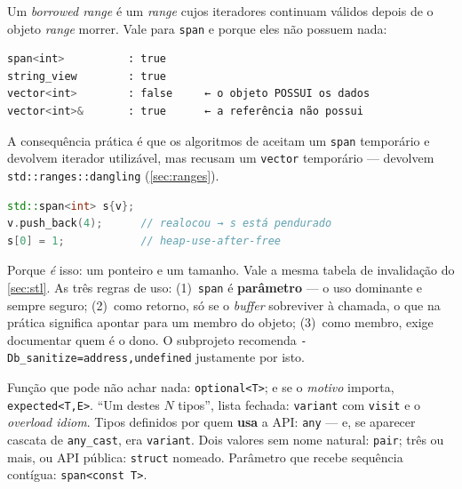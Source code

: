 Um \emph{borrowed range} é um \emph{range} cujos iteradores continuam válidos
depois de o objeto \emph{range} morrer. Vale para \texttt{span} e
 porque eles não possuem nada:

\begin{lstlisting}[style=bt, language=bash,
    caption={Saída de \texttt{src/vocabulary\_types/}:
             \texttt{std::ranges::borrowed\_range}.}]
span<int>          : true
string_view        : true
vector<int>        : false     ← o objeto POSSUI os dados
vector<int>&       : true      ← a referência não possui
\end{lstlisting}

A consequência prática é que os algoritmos de  aceitam um
\texttt{span} temporário e devolvem iterador utilizável, mas recusam um
\texttt{vector} temporário --- devolvem \texttt{std::ranges::dangling}
(\cref{sec:ranges}).

\begin{armadilha}
\begin{lstlisting}[style=bt, language=C++, frame=none,
                   xleftmargin=0pt, xrightmargin=0pt]
std::span<int> s{v};
v.push_back(4);      // realocou → s está pendurado
s[0] = 1;            // heap-use-after-free
\end{lstlisting}
Porque \emph{é} isso: um ponteiro e um tamanho. Vale a mesma tabela de
invalidação do \cref{sec:stl}. As três regras de uso: (1)~\texttt{span} é
\textbf{parâmetro} --- o uso dominante e sempre seguro; (2)~como retorno, só se
o \emph{buffer} sobreviver à chamada, o que na prática significa apontar para um
membro do objeto; (3)~como membro, exige documentar quem é o dono. O subprojeto
recomenda \texttt{-Db\_sanitize=address,undefined} justamente por isto.
\end{armadilha}

\begin{regra}
Função que pode não achar nada: \texttt{optional<T>}; e se o \emph{motivo}
importa, \texttt{expected<T,E>}. ``Um destes $N$ tipos'', lista fechada:
\texttt{variant} com \texttt{visit} e o \emph{overload idiom}. Tipos definidos
por quem \textbf{usa} a API: \texttt{any} --- e, se aparecer cascata de
\texttt{any\_cast}, era \texttt{variant}. Dois valores sem nome natural:
\texttt{pair}; três ou mais, ou API pública: \texttt{struct} nomeado. Parâmetro
que recebe sequência contígua: \texttt{span<const T>}.
\end{regra}

